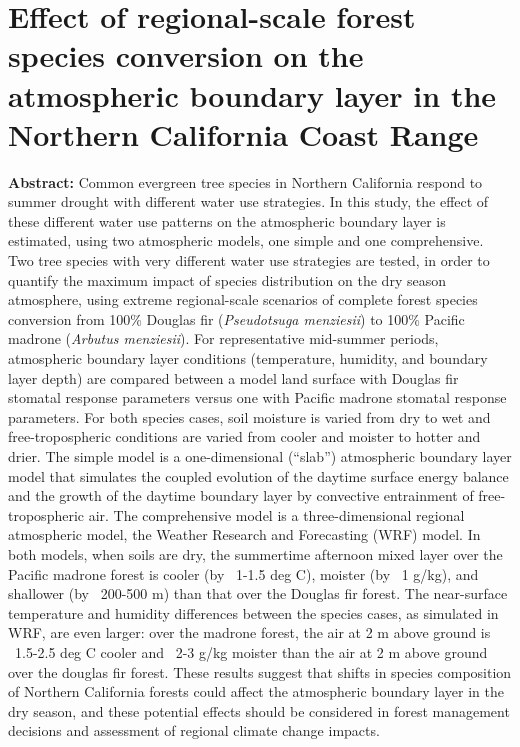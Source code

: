 \chapter{Effect of regional-scale forest species conversion on the atmospheric boundary layer in the Northern California Coast Range}
\label{c.BL}

\textbf{Abstract:}  Common evergreen tree species in Northern California respond to summer drought with different water use strategies.  In this study, the effect of these different water use patterns on the atmospheric boundary layer is estimated, using two atmospheric models, one simple and one comprehensive.  Two tree species with very different water use strategies are tested, in order to quantify the maximum impact of species distribution on the dry season atmosphere, using extreme regional-scale scenarios of complete forest species conversion from 100\% Douglas fir (\textit{Pseudotsuga menziesii}) to 100\% Pacific madrone (\textit{Arbutus menziesii}).  For representative mid-summer periods, atmospheric boundary layer conditions (temperature, humidity, and boundary layer depth) are compared between a model land surface with Douglas fir stomatal response parameters versus one with Pacific madrone stomatal response parameters.  For both species cases, soil moisture is varied from dry to wet and free-tropospheric conditions are varied from cooler and moister to hotter and drier.  The simple model is a one-dimensional (``slab'') atmospheric boundary layer model that simulates the coupled evolution of the daytime surface energy balance and the growth of the daytime boundary layer by convective entrainment of free-tropospheric air.  The comprehensive model is a three-dimensional regional atmospheric model, the Weather Research and Forecasting (WRF) model.  In both models, when soils are dry, the summertime afternoon mixed layer over the Pacific madrone forest is cooler (by ~1-1.5 deg C), moister (by ~1 g/kg), and shallower (by ~200-500 m) than that over the Douglas fir forest.  The near-surface temperature and humidity differences between the species cases, as simulated in WRF, are even larger: over the madrone forest, the air at 2 m above ground is ~1.5-2.5 deg C cooler and ~2-3 g/kg moister than the air at 2 m above ground over the douglas fir forest.  These results suggest that shifts in species composition of Northern California forests could affect the atmospheric boundary layer in the dry season, and these potential effects should be considered in forest management decisions and assessment of regional climate change impacts.








